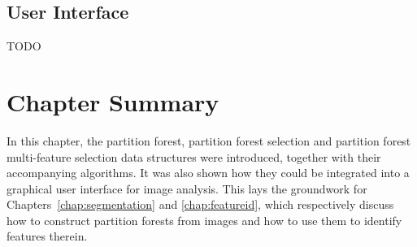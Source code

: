 \subsection{User Interface}

TODO

\section{Chapter Summary}

In this chapter, the partition forest, partition forest selection and partition forest multi-feature selection data structures were introduced, together with their accompanying algorithms. It was also shown how they could be integrated into a graphical user interface for image analysis. This lays the groundwork for Chapters~\ref{chap:segmentation} and \ref{chap:featureid}, which respectively discuss how to construct partition forests from images and how to use them to identify features therein.